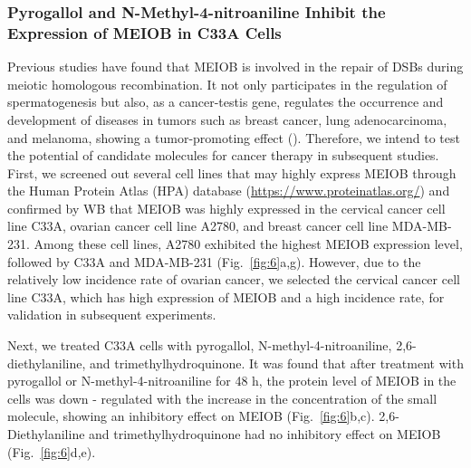 \documentclass[unnumsec,webpdf,contemporary,large]{oup-authoring-template}%
\theoremstyle{thmstyleone}%
\theoremstyle{thmstyletwo}%
\theoremstyle{thmstylethree}%
\begin{document}
\subsubsection*{Pyrogallol and N-Methyl-4-nitroaniline Inhibit the Expression of MEIOB in C33A Cells}

Previous studies have found that MEIOB is involved in the repair of DSBs during meiotic homologous recombination. It not only participates in the regulation of spermatogenesis but also, as a cancer-testis gene, regulates the occurrence and development of diseases in tumors such as breast cancer, lung adenocarcinoma, and melanoma, showing a tumor-promoting effect (\citealt{18,19,20}). Therefore, we intend to test the potential of candidate molecules for cancer therapy in subsequent studies. First, we screened out several cell lines that may highly express MEIOB through the Human Protein Atlas (HPA) database (\url{https://www.proteinatlas.org/}) and confirmed by WB that MEIOB was highly expressed in the cervical cancer cell line C33A, ovarian cancer cell line A2780, and breast cancer cell line MDA-MB-231. Among these cell lines, A2780 exhibited the highest MEIOB expression level, followed by C33A and MDA-MB-231 (Fig.~\ref{fig:6}a,g). However, due to the relatively low incidence rate of ovarian cancer, we selected the cervical cancer cell line C33A, which has high expression of MEIOB and a high incidence rate, for validation in subsequent experiments.

Next, we treated C33A cells with pyrogallol, N-methyl-4-nitroaniline, 2,6-diethylaniline, and trimethylhydroquinone. It was found that after treatment with pyrogallol or N-methyl-4-nitroaniline for 48 h, the protein level of MEIOB in the cells was down - regulated with the increase in the concentration of the small molecule, showing an inhibitory effect on MEIOB (Fig.~\ref{fig:6}b,c). 2,6-Diethylaniline and trimethylhydroquinone had no inhibitory effect on MEIOB (Fig.~\ref{fig:6}d,e).
\end{document}
